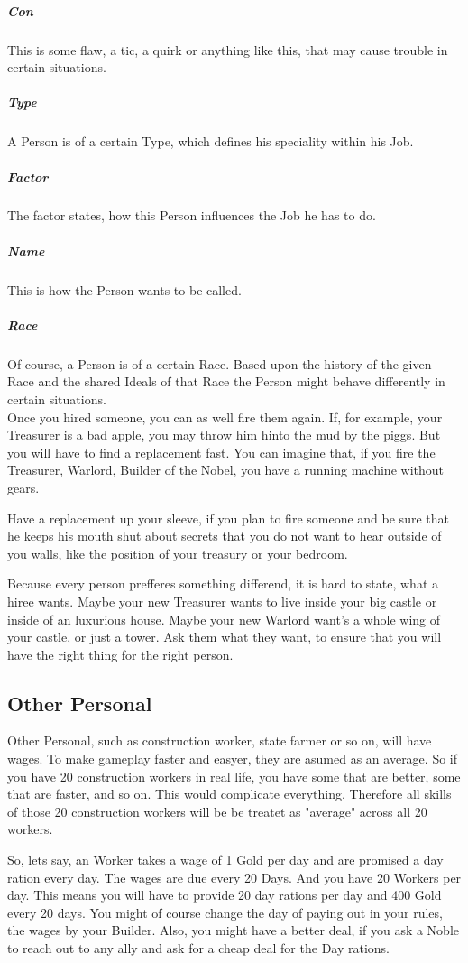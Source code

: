 \subparagraph{Con} This is some flaw, a tic, a quirk or anything like this, that may cause trouble in certain situations.

\subparagraph{Type} A Person is of a certain Type, which defines his speciality within his Job.

\subparagraph{Factor} The factor states, how this Person influences the Job he has to do.

\subparagraph{Name} This is how the Person wants to be called.

\subparagraph{Race} Of course, a Person is of a certain Race. Based upon the history of the given Race and the shared Ideals of that Race the Person might behave differently in certain situations.\\

Once you hired someone, you can as well fire them again. If, for example, your Treasurer is a bad apple, you may throw him hinto the mud by the piggs. But you will have to find a replacement fast. You can imagine that, if you fire the Treasurer, Warlord, Builder of the Nobel, you have a running machine without gears.

Have a replacement up your sleeve, if you plan to fire someone and be sure that he keeps his mouth shut about secrets that you do not want to hear outside of you walls, like the position of your treasury or your bedroom.

Because every person prefferes something differend, it is hard to state, what a hiree wants. Maybe your new Treasurer wants to live inside your big castle or inside of an luxurious house. Maybe your new Warlord want's a whole wing of your castle, or just a tower. Ask them what they want, to ensure that you will have the right thing for the right person.

\subsection{Other Personal}

Other Personal, such as construction worker, state farmer or so on, will have wages. To make gameplay faster and easyer, they are asumed as an average. So if you have 20 construction workers in real life, you have some that are better, some that are faster, and so on. This would complicate everything. Therefore all skills of those 20 construction workers will be be treatet as "average" across all 20 workers.

So, lets say, an Worker takes a wage of 1 Gold per day and are promised a day ration every day. The wages are due every 20 Days. And you have 20 Workers per day. This means you will have to provide 20 day rations per day and 400 Gold every 20 days. You might of course change the day of paying out in your rules, the wages by your Builder. Also, you might have a better deal, if you ask a Noble to reach out to any ally and ask for a cheap deal for the Day rations.

